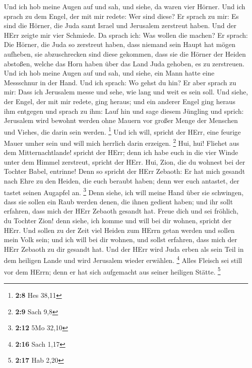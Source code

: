  Und ich hob meine Augen auf und sah, und siehe, da waren
vier Hörner.  Und ich sprach zu dem Engel, der mit mir
redete: Wer sind diese? Er sprach zu mir: Es sind die Hörner, die Juda
samt Israel und Jerusalem zerstreut haben.  Und der HErr
zeigte mir vier Schmiede.  Da sprach ich: Was wollen die
machen? Er sprach: Die Hörner, die Juda so zerstreut haben, dass niemand
sein Haupt hat mögen aufheben, sie abzuschrecken sind diese gekommen,
dass sie die Hörner der Heiden abstoßen, welche das Horn haben über das
Land Juda gehoben, es zu zerstreuen.  Und ich hob meine
Augen auf und sah, und siehe, ein Mann hatte eine Messschnur in der
Hand.  Und ich sprach: Wo gehst du hin? Er aber sprach zu
mir: Dass ich Jerusalem messe und sehe, wie lang und weit es sein soll.
 Und siehe, der Engel, der mit mir redete, ging heraus;
und ein anderer Engel ging heraus ihm entgegen  und sprach
zu ihm: Lauf hin und sage diesem Jüngling und sprich: Jerusalem wird
bewohnt werden ohne Mauern vor großer Menge der Menschen und Viehes, die
darin sein werden. \footnote{\textbf{2:8} Hes 38,11}  Und
ich will, spricht der HErr, eine feurige Mauer umher sein und will mich
herrlich darin erzeigen. \footnote{\textbf{2:9} Sach 9,8}
 Hui, hui! Fliehet aus dem Mitternachtlande! spricht der
HErr; denn ich habe euch in die vier Winde unter dem Himmel zerstreut,
spricht der HErr.  Hui, Zion, die du wohnest bei der
Tochter Babel, entrinne!  Denn so spricht der HErr
Zebaoth: Er hat mich gesandt nach Ehre zu den Heiden, die euch beraubt
haben; denn wer euch antastet, der tastet seinen Augapfel an.
\footnote{\textbf{2:12} 5Mo 32,10}  Denn siehe, ich will
meine Hand über sie schwingen, dass sie sollen ein Raub werden denen,
die ihnen gedient haben; und ihr sollt erfahren, dass mich der HErr
Zebaoth gesandt hat.  Freue dich und sei fröhlich, du
Tochter Zion! denn siehe, ich komme und will bei dir wohnen, spricht der
HErr.  Und sollen zu der Zeit viel Heiden zum HErrn getan
werden und sollen mein Volk sein; und ich will bei dir wohnen, und
sollst erfahren, dass mich der HErr Zebaoth zu dir gesandt hat.
 Und der HErr wird Juda erben als sein Teil in dem
heiligen Lande und wird Jerusalem wieder erwählen. \footnote{\textbf{2:16}
  Sach 1,17}  Alles Fleisch sei still vor dem HErrn; denn
er hat sich aufgemacht aus seiner heiligen Stätte. \footnote{\textbf{2:17}
  Hab 2,20}

